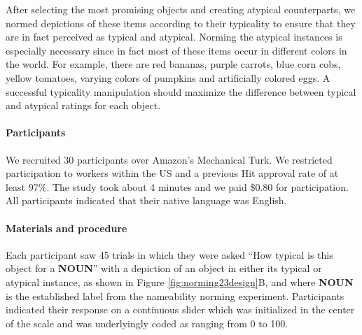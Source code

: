\documentclass[a4paper,man,floatsintext,natbib,donotrepeattitle]{apa6}
\begin{document}



After selecting the most promising objects and creating atypical counterparts, we normed depictions of these items according to their typicality to ensure that they are in fact perceived as typical and atypical. Norming the atypical instances is especially necessary since in fact most of these items occur in different colors in the world. For example, there are red bananas, purple carrots, blue corn cobs, yellow tomatoes, varying colors of pumpkins and artificially colored eggs. A successful typicality manipulation should maximize the difference between typical and atypical ratings for each object.

\paragraph{Participants}
We recruited 30 participants over Amazon's Mechanical Turk. We restricted participation to workers within the US and a previous Hit approval rate of at least 97\%. The study took about 4 minutes and we paid \$0.80 for participation. All participants indicated that their native language was English.

\paragraph{Materials and procedure}
Each participant saw 45 trials in which they were asked ``How typical is this object for a \textbf{NOUN}'' with a depiction of an object in either its typical or atypical instance, as shown in Figure \ref{fig:norming23design}B, and where \textbf{NOUN} is the established label from the nameability norming experiment. Participants indicated their response on a continuous slider which was initialized in the center of the scale and was underlyingly coded as ranging from 0 to 100.
\end{document}
